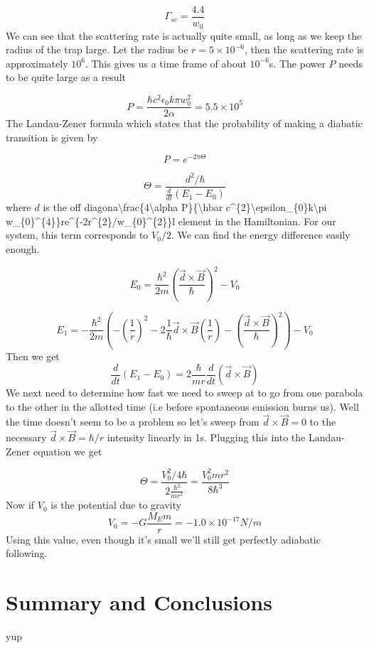 \[
\Gamma_{sc}=\frac{4.4}{w_{0}}
\]
We can see that the scattering rate is actually quite small, as long
as we keep the radius of the trap large. Let the radius be $r=5\times10^{-6}$,
then the scattering rate is approximately $10^{6}$. This gives us
a time frame of about $10^{-6}$s. The power $P$ needs to be quite
large as a result

\[
P=\frac{\hbar c^{2}\epsilon_{0}k\pi w_{0}^{2}}{2\alpha}=5.5\times10^{5}
\]
The Landau-Zener formula which states that the probability of making
a diabatic transition is given by

\[
P=e^{-2\pi\Theta}
\]


\[
\Theta=\frac{d^{2}/\hbar}{\frac{d}{dt}\left(E_{1}-E_{0}\right)}
\]
where $d$ is the off diagona\textbackslash{}frac\{4\textbackslash{}alpha
P\}\{\textbackslash{}hbar c\textasciicircum{}\{2\}\textbackslash{}epsilon\_\{0\}k\textbackslash{}pi
w\_\{0\}\textasciicircum{}\{4\}\}re\textasciicircum{}\{-2r\textasciicircum{}\{2\}/w\_\{0\}\textasciicircum{}\{2\}\}l
element in the Hamiltonian. For our system, this term corresponds
to $V_{0}/2$. We can find the energy difference easily enough.

\[
E_{0}=\frac{\hbar^{2}}{2m}\left(\frac{\vec{d}\times\vec{B}}{\hbar}\right)^{2}-V_{0}
\]


\[
E_{1}=-\frac{\hbar^{2}}{2m}\left(-\left(\frac{1}{r}\right)^{2}-2\frac{1}{\hbar}\vec{d}\times\vec{B}\left(\frac{1}{r}\right)-\left(\frac{\vec{d}\times\vec{B}}{\hbar}\right)^{2}\right)-V_{0}
\]
Then we get
\[
\frac{d}{dt}\left(E_{1}-E_{0}\right)=2\frac{\hbar}{mr}\frac{d}{dt}\left(\vec{d}\times\vec{B}\right)
\]
We next need to determine how fast we need to sweep at to go from
one parabola to the other in the allotted time (i.e before spontaneous
emission burns us). Well the time doesn't seem to be a problem so
let's sweep from $\vec{d}\times\vec{B}=0$ to the necessary $\vec{d}\times\vec{B}=\hbar/r$
intensity linearly in 1s. Plugging this into the Landau-Zener equation
we get

\[
\Theta=\frac{V_{0}^{2}/4\hbar}{2\frac{\hbar^{2}}{mr^{2}}}=\frac{V_{0}^{2}mr^{2}}{8\hbar^{3}}
\]
Now if $V_{0}$ is the potential due to gravity
\[
V_{0}=-G\frac{M_{E}m}{r}=-1.0\times10^{-17}N/m
\]
Using this value, even though it's small we'll still get perfectly
adiabatic following.





\section{Summary and Conclusions}

yup

